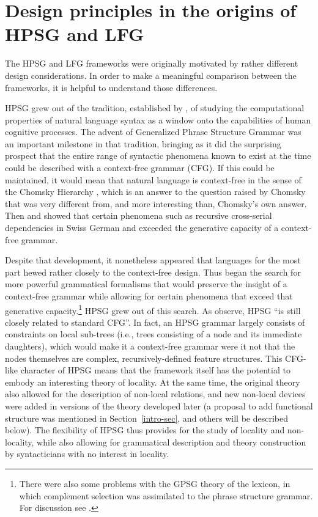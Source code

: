 \section{Design principles in the origins of HPSG and LFG} 
\label{design-sec}
The HPSG and LFG  frameworks were originally motivated by rather different design considerations.  In order to make a meaningful comparison between the frameworks, it is helpful to understand those differences.  

HPSG grew out of the tradition, established by \citet{Chomsky57a}, of studying the computational properties of natural language syntax as a window onto the capabilities of human cognitive processes.  The advent of Generalized Phrase Structure Grammar\indexgpsg \citep{GKPS85a} was an important milestone in that tradition, bringing as it did the surprising prospect that the entire range of syntactic phenomena known to exist at the time could be described with a context-free grammar (CFG).  If this could be maintained, it would mean that natural language is context-free in the sense of the Chomsky Hierarchy \citep{Chomsky57a}, which is an answer to the question raised by Chomsky that was very different from, and more interesting than, Chomsky's own answer.  Then  \citet{Shieber85a} and \citet{Culy85a} showed that certain phenomena such as recursive cross-serial dependencies in Swiss German and  exceeded the generative capacity of a context-free grammar.   


Despite that development, it nonetheless appeared that languages for the most part hewed rather closely to the context-free design.  Thus began the search for more powerful grammatical formalisms that would preserve the insight of a context-free grammar while allowing for certain phenomena that exceed that generative capacity.\footnote{There were also some problems with the GPSG theory of the lexicon, in which complement selection was assimilated to the phrase structure grammar.  For discussion see \citet[Section~4.1]{MWArgSt}.}  HPSG grew out of this search. As  \citet[83]{SWB2003a} observe, HPSG ``is still  closely related to standard CFG''.  In fact, an HPSG grammar largely consists of constraints on local sub-trees (i.e., trees consisting of a node and its immediate daughters), which would make it a context-free grammar were it not that the nodes themselves are complex, recursively-defined feature structures.   This CFG-like character of HPSG means that the framework itself has the potential to embody an interesting theory of locality.   At the same time, the original theory also allowed for the description of non-local relations, and new non-local devices were added in versions of the theory developed later (a proposal to add functional structure was mentioned in Section~\ref{intro-sec}, and others will be described below).  The flexibility of HPSG thus provides for the study of locality and non-locality, while also allowing for grammatical description and theory construction by syntacticians with no interest in locality.  


